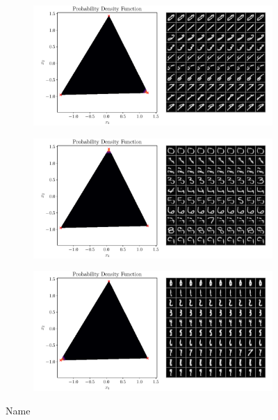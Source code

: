 \begin{figure}[htpb]
    \centering
    \begin{subfigure}[htpb]{\textwidth}
        \centering
        \includegraphics[width=1\linewidth]{figures/samples/aa_emnist1.pdf}
    \end{subfigure}

    \begin{subfigure}[htpb]{\textwidth}
        \centering
        \includegraphics[width=1\linewidth]{figures/samples/aa_emnist2.pdf}
    \end{subfigure}

    \begin{subfigure}[htpb]{\textwidth}
        \centering
        \includegraphics[width=1\linewidth]{figures/samples/aa_emnist3.pdf}
    \end{subfigure}
    \caption{Name}%
    \label{fig:aa_emnist_corners}
\end{figure}

